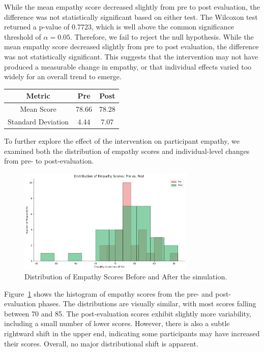 While the mean empathy score decreased slightly from pre to post evaluation, the difference was not statistically significant based on either test. The Wilcoxon test returned a p-value of 0.7723, which is well above the common significance threshold of $\alpha = 0.05$. Therefore, we fail to reject the null hypothesis. While the mean empathy score decreased slightly from pre to post evaluation, the difference was not statistically significant. This suggests that the intervention may not have produced a measurable change in empathy, or that individual effects varied too widely for an overall trend to emerge.


\begin{center}
\begin{tabular}{|c|c|c|}
\hline
\textbf{Metric} & \textbf{Pre} & \textbf{Post} \\
\hline
Mean Score & 78.66 & 78.28 \\
Standard Deviation & 4.44 & 7.07 \\
\hline
\end{tabular}
\end{center}

To further explore the effect of the intervention on participant empathy, we examined both the distribution of empathy scores and individual-level changes from pre- to post-evaluation.

\begin{figure}[htbp]
    \centering
    \includegraphics[width=0.75\textwidth]{../../Figures/emp-comparison.png}
    \caption{Distribution of Empathy Scores Before and After the simulation.}
    \label{fig:empathy_dist_hist}
\end{figure}

Figure~\ref{fig:empathy_dist_hist} shows the histogram of empathy scores from the pre- and post-evaluation phases. The distributions are visually similar, with most scores falling between 70 and 85. The post-evaluation scores exhibit slightly more variability, including a small number of lower scores. However, there is also a subtle rightward shift in the upper end, indicating some participants may have increased their scores. Overall, no major distributional shift is apparent.

